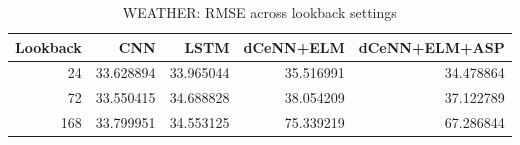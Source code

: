\begin{table}
\caption{WEATHER: RMSE across lookback settings}
\begin{tabular}{rrrrr}
\toprule
Lookback & CNN & LSTM & dCeNN+ELM & dCeNN+ELM+ASP \\
\midrule
24 & 33.628894 & 33.965044 & 35.516991 & 34.478864 \\
72 & 33.550415 & 34.688828 & 38.054209 & 37.122789 \\
168 & 33.799951 & 34.553125 & 75.339219 & 67.286844 \\
\bottomrule
\end{tabular}
\end{table}
